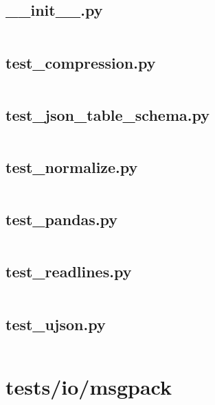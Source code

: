 \documentclass{article}
\begin{document}
\subsection{\_\_init\_\_.py}
\inputminted{python}{/home/dufferzafar/dev/@clones/pandas/pandas/tests/io/json/__init__.py}
\newpage

\subsection{test\_compression.py}
\inputminted{python}{/home/dufferzafar/dev/@clones/pandas/pandas/tests/io/json/test_compression.py}
\newpage

\subsection{test\_json\_table\_schema.py}
\inputminted{python}{/home/dufferzafar/dev/@clones/pandas/pandas/tests/io/json/test_json_table_schema.py}
\newpage

\subsection{test\_normalize.py}
\inputminted{python}{/home/dufferzafar/dev/@clones/pandas/pandas/tests/io/json/test_normalize.py}
\newpage

\subsection{test\_pandas.py}
\inputminted{python}{/home/dufferzafar/dev/@clones/pandas/pandas/tests/io/json/test_pandas.py}
\newpage

\subsection{test\_readlines.py}
\inputminted{python}{/home/dufferzafar/dev/@clones/pandas/pandas/tests/io/json/test_readlines.py}
\newpage

\subsection{test\_ujson.py}
\inputminted{python}{/home/dufferzafar/dev/@clones/pandas/pandas/tests/io/json/test_ujson.py}
\newpage

\section{tests/io/msgpack}
\end{document}
